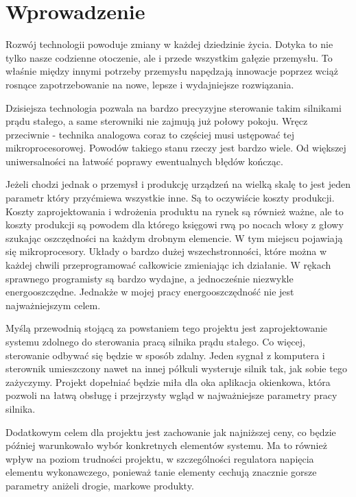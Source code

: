   \chapter{Wprowadzenie}
  
    Rozwój technologii powoduje zmiany w każdej dziedzinie życia. Dotyka to nie tylko nasze codzienne otoczenie, ale i przede wszystkim gałęzie przemysłu. To właśnie między innymi potrzeby przemysłu napędzają innowacje poprzez wciąż rosnące zapotrzebowanie na nowe, lepsze i wydajniejsze rozwiązania. 
    
    Dzisiejsza technologia pozwala na bardzo precyzyjne sterowanie takim silnikami prądu stałego, a same sterowniki nie zajmują już połowy pokoju. Wręcz przeciwnie - technika analogowa coraz to częściej musi ustępować tej mikroprocesorowej. Powodów takiego stanu rzeczy jest bardzo wiele. Od większej uniwersalności na łatwość poprawy ewentualnych błędów kończąc. 
    
    Jeżeli chodzi jednak o przemysł i produkcję urządzeń na wielką skalę to jest jeden parametr który przyćmiewa wszystkie inne. Są to oczywiście koszty produkcji. Koszty zaprojektowania i wdrożenia produktu na rynek są również ważne, ale to koszty produkcji są powodem dla którego księgowi rwą po nocach włosy z głowy szukając oszczędności na każdym drobnym elemencie. W tym miejscu pojawiają się mikroprocesory. Układy o bardzo dużej wszechstronności, które można w każdej chwili przeprogramować całkowicie zmieniając ich działanie. W rękach sprawnego programisty są bardzo wydajne, a jednocześnie niezwykle energooszczędne. Jednakże w mojej pracy energooszczędność nie jest najważniejszym celem. 
    
    Myślą przewodnią stojącą za powstaniem tego projektu jest zaprojektowanie systemu zdolnego do sterowania pracą silnika prądu stałego. Co więcej, sterowanie odbywać się będzie w sposób zdalny. Jeden sygnał z komputera i sterownik umieszczony nawet na innej półkuli wysteruje silnik tak, jak sobie tego zażyczymy. Projekt dopełniać będzie miła dla oka aplikacja okienkowa, która pozwoli na łatwą obsługę i przejrzysty wgląd w najważniejsze parametry pracy silnika. 
    
    Dodatkowym celem dla projektu jest zachowanie jak najniższej ceny, co będzie później warunkowało wybór konkretnych elementów systemu. Ma to również wpływ na poziom trudności projektu, w szczególności regulatora napięcia elementu wykonawczego, ponieważ tanie elementy cechują znacznie gorsze parametry aniżeli drogie, markowe produkty.
    

